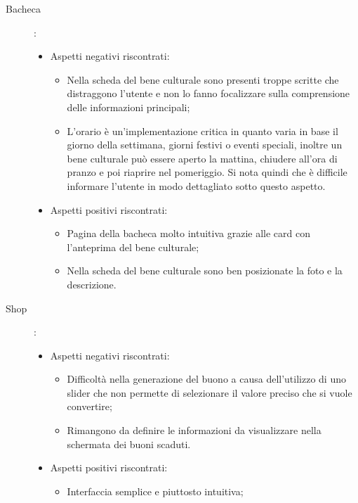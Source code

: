 \documentclass{article}
\begin{document}
\begin{description}
\item [Bacheca] :
\begin{itemize}
	\item Aspetti negativi riscontrati:
		\begin{itemize}
		\item Nella scheda del bene culturale sono presenti troppe scritte che distraggono l’utente e non lo fanno focalizzare sulla comprensione delle informazioni principali;
        \item L’orario è un’implementazione critica in quanto varia in base il giorno della settimana, giorni festivi o eventi speciali, inoltre un bene culturale può essere aperto la mattina, chiudere all’ora di pranzo e poi riaprire nel pomeriggio. Si nota quindi che è difficile informare l’utente in modo dettagliato sotto questo aspetto.
        \end{itemize}
	\item Aspetti positivi riscontrati:
		\begin{itemize}
        \item Pagina della bacheca molto intuitiva grazie alle card con l’anteprima del bene culturale;
        \item Nella scheda del bene culturale sono ben posizionate la foto e la descrizione.
        \end{itemize}
	\end{itemize}
\item [Shop] :
\begin{itemize}
	\item Aspetti negativi riscontrati:
		\begin{itemize}
		\item Difficoltà nella generazione del buono a causa dell’utilizzo di uno slider che non permette di selezionare il valore preciso che si vuole convertire;
		\item Rimangono da definire le informazioni da visualizzare nella schermata dei buoni scaduti.
        \end{itemize}
	\item Aspetti positivi riscontrati:
		\begin{itemize}
        \item Interfaccia semplice e piuttosto intuitiva;
        \end{itemize}
	\end{itemize}
\end{description}
\end{document}
